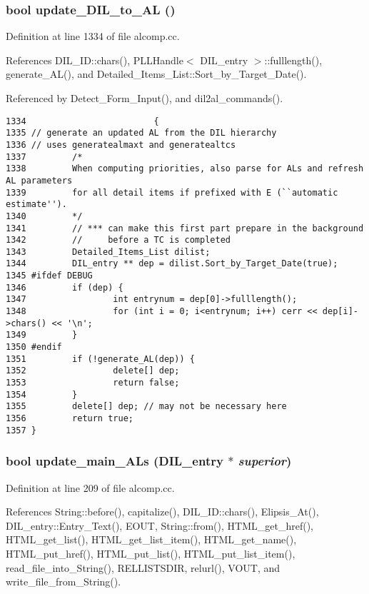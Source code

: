 \subsubsection{\setlength{\rightskip}{0pt plus 5cm}bool update\_\-DIL\_\-to\_\-AL ()}\label{alcomp_8cc_a16}




Definition at line 1334 of file alcomp.cc.

References DIL\_\-ID::chars(), PLLHandle$<$ DIL\_\-entry $>$::fulllength(), generate\_\-AL(), and Detailed\_\-Items\_\-List::Sort\_\-by\_\-Target\_\-Date().

Referenced by Detect\_\-Form\_\-Input(), and dil2al\_\-commands().



\footnotesize\begin{verbatim}1334                         {
1335 // generate an updated AL from the DIL hierarchy
1336 // uses generatealmaxt and generatealtcs
1337         /*
1338         When computing priorities, also parse for ALs and refresh AL parameters
1339         for all detail items if prefixed with E (``automatic estimate'').
1340         */
1341         // *** can make this first part prepare in the background
1342         //     before a TC is completed
1343         Detailed_Items_List dilist;
1344         DIL_entry ** dep = dilist.Sort_by_Target_Date(true);
1345 #ifdef DEBUG
1346         if (dep) {
1347                 int entrynum = dep[0]->fulllength();
1348                 for (int i = 0; i<entrynum; i++) cerr << dep[i]->chars() << '\n';
1349         }
1350 #endif
1351         if (!generate_AL(dep)) {
1352                 delete[] dep;
1353                 return false;
1354         }
1355         delete[] dep; // may not be necessary here
1356         return true;
1357 }
\end{verbatim}\normalsize 
{}
\subsubsection{\setlength{\rightskip}{0pt plus 5cm}bool update\_\-main\_\-ALs ({\bf DIL\_\-entry} $\ast$ {\em superior})}\label{alcomp_8cc_a8}




Definition at line 209 of file alcomp.cc.

References String::before(), capitalize(), DIL\_\-ID::chars(), Elipsis\_\-At(), DIL\_\-entry::Entry\_\-Text(), EOUT, String::from(), HTML\_\-get\_\-href(), HTML\_\-get\_\-list(), HTML\_\-get\_\-list\_\-item(), HTML\_\-get\_\-name(), HTML\_\-put\_\-href(), HTML\_\-put\_\-list(), HTML\_\-put\_\-list\_\-item(), read\_\-file\_\-into\_\-String(), RELLISTSDIR, relurl(), VOUT, and write\_\-file\_\-from\_\-String().

